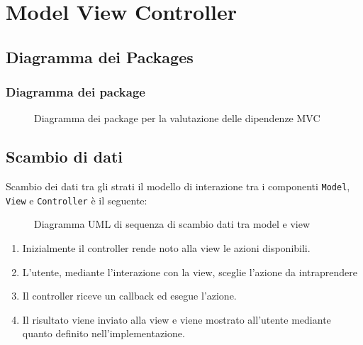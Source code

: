 \section{Model View Controller}

\subsection{Diagramma dei Packages}
\begin{frame}
    \frametitle{Diagramma dei package}
    \begin{figure}
        \centering
        \caption{Diagramma dei package per la valutazione delle dipendenze MVC}
    \end{figure}
\end{frame}

\subsection{Scambio di dati}
\begin{frame}{Scambio dei dati tra gli strati}
    il modello di interazione tra i componenti \texttt{Model}, \texttt{View} e \texttt{Controller} è il seguente:

    \begin{minipage}{.49\textwidth}
        \begin{figure}
            \centering
            \caption{Diagramma UML di sequenza di scambio dati tra model e view}
        \end{figure}
    \end{minipage}
    \begin{minipage}{.49\textwidth}
        \begin{enumerate}
            \item<1-> Inizialmente il controller rende noto alla view le azioni disponibili.
            \item<2-> L'utente, mediante l'interazione con la view, sceglie l'azione da intraprendere
            \item<3-> Il controller riceve un callback ed esegue l'azione.
            \item <4-> Il risultato viene inviato alla view e viene mostrato all'utente mediante quanto definito nell'implementazione.
        \end{enumerate}
    \end{minipage}
\end{frame}

